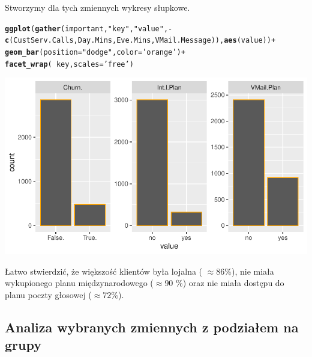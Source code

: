 \documentclass{article}\usepackage[]{graphicx}\usepackage[]{color}
\makeatletter
\def\maxwidth{ %
  \ifdim\Gin@nat@width>\linewidth
    \linewidth
  \else
    \Gin@nat@width
  \fi
}
\newcommand{\hlstr}[1]{\textcolor[rgb]{0.192,0.494,0.8}{#1}}%
\newcommand{\hlopt}[1]{\textcolor[rgb]{0,0,0}{#1}}%
\newcommand{\hlstd}[1]{\textcolor[rgb]{0.345,0.345,0.345}{#1}}%
\newcommand{\hlkwc}[1]{\textcolor[rgb]{0.333,0.667,0.333}{#1}}%
\newcommand{\hlkwd}[1]{\textcolor[rgb]{0.737,0.353,0.396}{\textbf{#1}}}%
\newenvironment{kframe}{%
 \def\at@end@of@kframe{}%
 \ifinner\ifhmode%
  \def\at@end@of@kframe{\end{minipage}}%
  \begin{minipage}{\columnwidth}%
 \fi\fi%
 \def\FrameCommand##1{\hskip\@totalleftmargin \hskip-\fboxsep
 \colorbox{shadecolor}{##1}\hskip-\fboxsep
     \hskip-\linewidth \hskip-\@totalleftmargin \hskip\columnwidth}%
 \MakeFramed {\advance\hsize-\width
   \@totalleftmargin\z@ \linewidth\hsize
   \@setminipage}}%
 {\par\unskip\endMakeFramed%
 \at@end@of@kframe}
\newenvironment{knitrout}{}{} %
\makeatother
\begin{document}
Stworzymy dla tych zmiennych wykresy słupkowe.
\begin{knitrout}
\color{fgcolor}\begin{kframe}
\begin{alltt}
\hlkwd{ggplot}\hlstd{(}\hlkwd{gather}\hlstd{(important,} \hlstr{"key"}\hlstd{,} \hlstr{"value"}\hlstd{,} \hlopt{-}\hlkwd{c}\hlstd{(CustServ.Calls, Day.Mins, Eve.Mins, VMail.Message)),} \hlkwd{aes}\hlstd{(value))} \hlopt{+}
  \hlkwd{geom_bar}\hlstd{(}\hlkwc{position}\hlstd{=}\hlstr{"dodge"}\hlstd{,} \hlkwc{color}\hlstd{=}\hlstr{'orange'}\hlstd{)} \hlopt{+}
  \hlkwd{facet_wrap}\hlstd{(}\hlopt{~}\hlstd{key,} \hlkwc{scales}\hlstd{=}\hlstr{'free'}\hlstd{)}
\end{alltt}
\end{kframe}

{\centering \includegraphics[width=\maxwidth]{figure/Wykresy_slupkowe_dla_wybranych_zmiennych-1} 

}



\end{knitrout}
Łatwo stwierdzić, że większość klientów była lojalna ( $\approx 86$\%), nie miała wykupionego planu międzynarodowego ($\approx 90$ \%) oraz nie miała dostępu do planu poczty głosowej ($\approx 72$\%).  

\subsection{Analiza wybranych zmiennych z podziałem na grupy}
\end{document}

